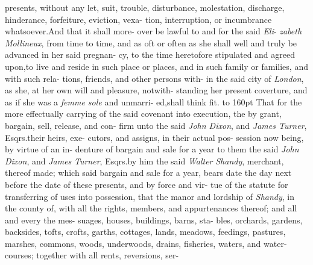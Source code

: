 \documentclass{article}
\begin{document}
\lqq presents, without any let, suit, trouble,\break
\lqq disturbance, molestation, discharge,\break
\lqq hinderance, forfeiture, eviction, vexa-\break
\lqq tion, interruption, or incumbrance\break
\lqq whatsoever.\tsk  And that it shall more-
\lqq over be lawful to and for the said \textit{Eli}-\break
\lqq \textit{zabeth Mollineux}, from time to time,\break
\lqq and as oft or often as she shall well and\break
\lqq truly be advanced in her said pregnan-\break
\lqq cy, to the time heretofore stipulated\break
\lqq and agreed upon,\tsk  to live and reside\break
\lqq in such place or places, and in such\break
\lqq family or families, and with such rela-\break
\lqq tions, friends, and other persons with-\break
\lqq in the said city of \textit{London}, as she, at\break
\lqq her own will and pleasure, notwith-\break
\lqq standing her present coverture, and as\break
\lqq if she was a \textit{femme sole} and unmarri-\break
\lqq ed,\tsk  shall think fit.\tsk {}\hbox{}\break
\lqq {}\hbox to 160pt{}\break
\lqq That for the more effectually carrying\break
\lqq of the said covenant into execution, the\break
\lqq {}\break
\lqq by grant, bargain, sell, release, and con-\break
\lqq firm unto the said \textit{John Dixon}, and\break
\lqq \textit{James Turner}, Esqrs.\@ their heirs, exe-
\lqq cutors, and assigns, in their actual pos-\break
\lqq session now being, by virtue of an in-\break
\lqq denture of bargain and sale for a year\break
\lqq to them the said \textit{John Dixon}, and \textit{James}\break
\lqq \textit{Turner}, Esqrs.\@ by him the said \textit{Walter}\break
\lqq \textit{Shandy}, merchant, thereof made; which\break
\lqq said bargain and sale for a year, bears\break
\lqq date the day next before the date of\break
\lqq these presents, and by force and vir-\break
\lqq tue of the statute for transferring of\break
\lqq uses into possession,\tsk {}\hbox{} that\break
\lqq the manor and lordship of \textit{Shandy}, in\break
\lqq the county of\tsh  , with all the\break
\lqq rights, members, and appurtenances\break
\lqq thereof; and all and every the mes-\break
\lqq suages, houses, buildings, barns, sta-\break
\lqq bles, orchards, gardens, backsides,\break
\lqq tofts, crofts, garths, cottages, lands,\break
\lqq meadows, feedings, pastures, marshes,\break
\lqq commons, woods, underwoods, drains,\break
\lqq fisheries, waters, and water-courses;\tsk{} 
\lqq together with all rents, reversions, ser-\break
\end{document}
